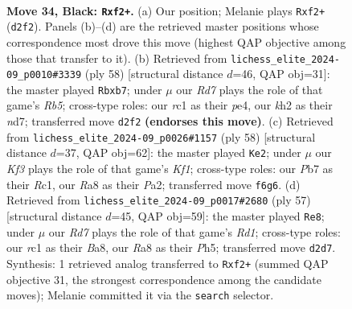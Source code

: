 \documentclass[11pt]{article}
\begin{document}
\clearpage

\begin{figure}[p]\centering
\begin{subfigure}{0.46\textwidth}\centering
\resizebox{\linewidth}{!}{%
\newchessgame
\chessboard[
  setfen={r7/pp3p2/5k2/7p/bP2P3/P5Pp/B2r1P1K/R1R5 b - - 5 34},
  showmover=false,
  pgfstyle=straightmove, color=movearrow, markmove={d2-f2}
]}
\caption{}
\end{subfigure}\hfill
\begin{subfigure}{0.46\textwidth}\centering
\resizebox{\linewidth}{!}{%
\newchessgame
\chessboard[
  setfen={4r2r/Rp1n2p1/4k3/1RP2p2/3PpB2/7P/5PK1/8 w - - 3 30},
  showmover=false,
  pgfstyle=straightmove, color=movearrow, markmove={b5-b7}
]}
\caption{}
\end{subfigure}
\\[4pt]
\begin{subfigure}{0.46\textwidth}\centering
\resizebox{\linewidth}{!}{%
\newchessgame
\chessboard[
  setfen={1k4r1/pp6/1b2Rpr1/1N5p/8/5P1P/PP3P2/2R2K2 w - - 5 30},
  showmover=false,
  pgfstyle=straightmove, color=movearrow, markmove={f1-e2}
]}
\caption{}
\end{subfigure}\hfill
\begin{subfigure}{0.46\textwidth}\centering
\resizebox{\linewidth}{!}{%
\newchessgame
\chessboard[
  setfen={b2r4/2R2pk1/P7/4P2p/1P4p1/8/1r3PpP/R2B2K1 b - - 0 29},
  showmover=false,
  pgfstyle=straightmove, color=movearrow, markmove={d8-e8}
]}
\caption{}
\end{subfigure}
\caption{\textbf{Move 34, Black: \texttt{Rxf2+}.} (a) Our position; Melanie plays \texttt{Rxf2+} (\texttt{d2f2}). Panels (b)--(d) are the retrieved master positions whose correspondence most drove this move (highest QAP objective among those that transfer to it). (b) Retrieved from \texttt{lichess\_elite\_2024-09\_p0010\#3339} (ply 58) [structural distance $d$=46, QAP obj=31]: the master played \texttt{Rbxb7}; under $\mu$ our \emph{Rd7} plays the role of that game's \emph{Rb5}; cross-type roles: our \emph{r}c1 as their \emph{p}e4, our \emph{k}h2 as their \emph{n}d7; transferred move \texttt{d2f2} \textbf{(endorses this move)}. (c) Retrieved from \texttt{lichess\_elite\_2024-09\_p0026\#1157} (ply 58) [structural distance $d$=37, QAP obj=62]: the master played \texttt{Ke2}; under $\mu$ our \emph{Kf3} plays the role of that game's \emph{Kf1}; cross-type roles: our \emph{P}b7 as their \emph{R}c1, our \emph{R}a8 as their \emph{P}a2; transferred move \texttt{f6g6}. (d) Retrieved from \texttt{lichess\_elite\_2024-09\_p0017\#2680} (ply 57) [structural distance $d$=45, QAP obj=59]: the master played \texttt{Re8}; under $\mu$ our \emph{Rd7} plays the role of that game's \emph{Rd1}; cross-type roles: our \emph{r}c1 as their \emph{B}a8, our \emph{R}a8 as their \emph{P}h5; transferred move \texttt{d2d7}. Synthesis: 1 retrieved analog transferred to \texttt{Rxf2+} (summed QAP objective 31, the strongest correspondence among the candidate moves); Melanie committed it via the \texttt{search} selector.}
\label{fig:thought-m67}
\end{figure}
\end{document}

